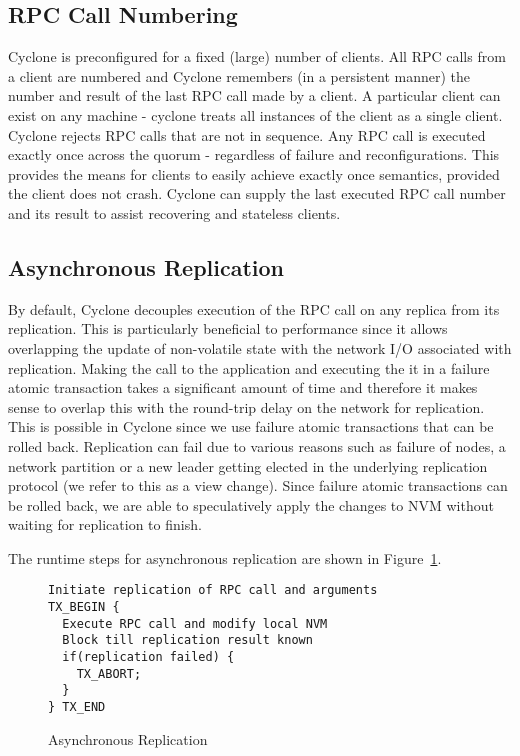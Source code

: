 \documentclass[twocolumn]{article}
\begin{document}
\subsection{RPC Call Numbering}
Cyclone is preconfigured for a fixed (large) number of clients. All RPC calls
from a client are numbered and Cyclone remembers (in a persistent manner) the
number and result of the last RPC call made by a client. A particular client can
exist on any machine - cyclone treats all instances of the client as a single
client. Cyclone rejects RPC calls that are not in sequence. Any RPC call is
executed exactly once across the quorum - regardless of failure and
reconfigurations. This provides the means for clients to easily achieve exactly
once semantics, provided the client does not crash. Cyclone can supply the last
executed RPC call number and its result to assist recovering and stateless
clients.

\subsection{Asynchronous Replication}
By default, Cyclone decouples execution of the RPC call on any replica from its
replication. This is particularly beneficial to performance since it allows
overlapping the update of non-volatile state with the network I/O associated
with replication. Making the call to the application and executing the it in a
failure atomic transaction takes a
significant amount of time and therefore it makes sense to overlap this with the
round-trip delay on the network for replication. This is possible in Cyclone
since we use failure atomic transactions that can be rolled back. Replication
can fail due to various reasons such as failure of nodes, a network partition or
a new leader getting elected in the underlying replication protocol
(we refer to this as a view change). Since failure atomic transactions can be
rolled back, we are able to speculatively apply the changes to NVM without
waiting for replication to finish.

The runtime steps for asynchronous replication are shown in
Figure~\ref{fig:async_rep}.

\begin{figure}
{ \scriptsize
\begin{verbatim}
Initiate replication of RPC call and arguments
TX_BEGIN {
  Execute RPC call and modify local NVM
  Block till replication result known
  if(replication failed) {
    TX_ABORT;
  }
} TX_END
\end{verbatim}
}
\caption{Asynchronous Replication}
\label{fig:async_rep}
\end{figure}
\end{document}
